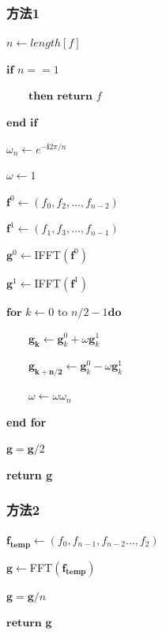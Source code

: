 \documentclass{ctexart}
\begin{document}
	\subsubsection{方法1}

$n\leftarrow length[f]$ 

$\textbf{if }n= = 1$

$\quad\quad\textbf{then return }f$

$\textbf{end if}$

$\omega_n\leftarrow e^{\boldsymbol{-i}2\pi/n}$

$\omega\leftarrow1$

$\mathbf{f}^{0}\leftarrow(f_{0},f_{2},\ldots,f_{n-2})$

$\mathbf{f}^{1}\leftarrow(f_{1},f_{3},\ldots,f_{n-1})$

$\mathbf{g}^0\leftarrow$IFFT$(\mathbf{f}^0)$

$\mathbf{g}^1\leftarrow$IFFT$(\mathbf{f}^1)$ 

$\textbf{for }k\leftarrow 0$ to $n/ 2- 1\textbf{do}$

$\quad\quad\mathbf{g_k}\leftarrow\mathbf{g}_k^0+\omega\mathbf{g}_k^1$

$\quad\quad\mathbf{g_{k+n/2}}\leftarrow\mathbf{g}_k^0-\omega\mathbf{g}_k^1$

$\quad\quad\omega\leftarrow\omega\omega_n$

\textbf{end for}

$\mathbf{g} = \mathbf{g}/2$

\textbf{return g}
\subsubsection{方法2}
$\mathbf{f_{temp}}\leftarrow(f_{0},f_{n-1},f_{n-2}\ldots,f_{2})$

$\mathbf{g}\leftarrow$FFT$(\mathbf{f_{temp}})$

$\mathbf{g} = \mathbf{g}/n$

$\textbf{return g}$
\end{document}
